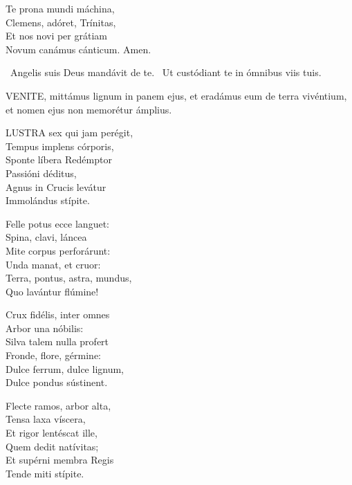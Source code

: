 
Te prona mundi máchina,\\
Clemens, adóret, Trínitas,\\
Et nos novi per grátiam\\
Novum canámus cánticum. Amen.

\V\ Angelis suis Deus mandávit de te. \R\ Ut custódiant te in ómnibus viis tuis.





\lettrine[lines=2]{V}{ENITE}, mittámus lignum in panem ejus, et eradámus eum de terra vivéntium, et nomen ejus non memorétur ámplius.



\lettrine[lines=2]{L}{USTRA} sex qui jam perégit,\\
Tempus implens córporis,\\
Sponte líbera Redémptor\\
Passióni déditus,\\
Agnus in Crucis levátur\\
Immolándus stípite.

Felle potus ecce languet:\\
Spina, clavi, láncea\\
Mite corpus perforárunt:\\
Unda manat, et cruor:\\
Terra, pontus, astra, mundus,\\
Quo lavántur flúmine!

Crux fidélis, inter omnes\\
Arbor una nóbilis:\\
Silva talem nulla profert\\
Fronde, flore, gérmine:\\
Dulce ferrum, dulce lignum,\\
Dulce pondus sústinent.

Flecte ramos, arbor alta,\\
Tensa laxa víscera,\\
Et rigor lentéscat ille,\\
Quem dedit natívitas;\\
Et supérni membra Regis\\
Tende miti stípite.

